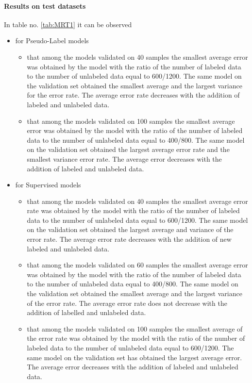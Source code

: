 \documentclass[12pt]{article}
\theoremstyle{definition}
\DeclareRobustCommand{\[}{\begin{equation}}
\DeclareRobustCommand{\]}{\end{equation}}
\begin{document}
\paragraph{Results on test datasets}
In table no. \ref{tab:MRT1} it  can be observed
\begin{itemize}
    \item for Pseudo-Label models
    \begin{itemize}
        \item that among the models validated on 40 samples the smallest average error was obtained by the model with the ratio of the number of labeled data to the number of unlabeled data equal to 600/1200. The same model on the validation set obtained the smallest average and the largest variance for the error rate. The average error rate decreases with the addition of labeled and unlabeled data. 
        \item that among the models validated on 100 samples the smallest average error was obtained by the model with the ratio of the number of labeled data to the number of unlabeled data equal to 400/800. The same model on the validation set obtained the largest average error rate and the smallest variance error rate. The average error decreases with the addition of labeled and unlabeled data.
    \end{itemize}
    \item for Supervised models
    \begin{itemize}
        \item that among the models validated on 40 samples the smallest average error rate was obtained by the model with the ratio of the number of labeled data to the number of unlabeled data equal to 600/1200. The same model on the validation set obtained the largest average and  variance of the error rate. The average error rate decreases with the addition of new labeled and unlabeled data.  
        \item that among the models validated on 60 samples the smallest average error was obtained by the model with the ratio of the number of labeled data to the number of unlabeled data equal to 400/800. The same model on the validation set obtained the smallest average and the largest variance of the error rate. The average error rate does not decrease with the addition of labelled and unlabeled data. 
        \item that among the models validated on 100 samples the smallest average of the error rate  was obtained by the model with the ratio of the number of labeled data to the number of unlabeled data equal to 600/1200. The same model on the validation set has obtained the largest average error. The average error decreases with the addition of labeled and unlabeled data.  
    \end{itemize}
\end{itemize}
\end{document}
